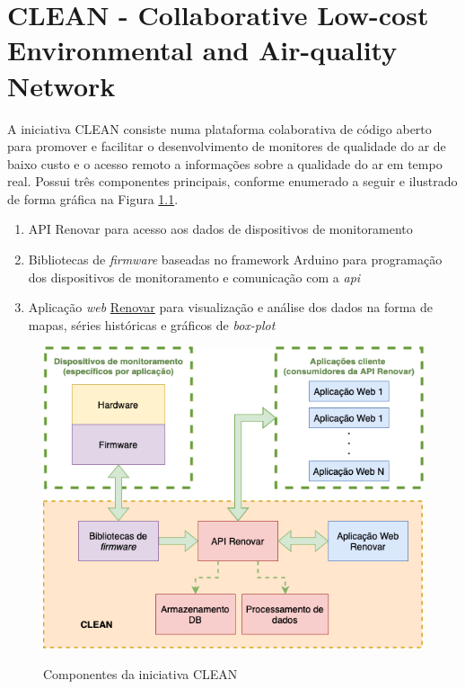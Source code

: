 \chapter{CLEAN - Collaborative Low-cost Environmental and Air-quality Network}\label{cap:clean-initiative}

A iniciativa CLEAN consiste numa plataforma colaborativa de código aberto para promover e facilitar o desenvolvimento de monitores de qualidade do ar de baixo custo e o acesso remoto a informações sobre a qualidade do ar em tempo real. Possui três componentes principais, conforme enumerado a seguir e ilustrado de forma gráfica na Figura \ref{fig:clean-structure}.

\begin{enumerate}
    \item API Renovar para acesso aos dados de dispositivos de monitoramento
    \item Bibliotecas de \textit{firmware} baseadas no framework Arduino para programação dos dispositivos de monitoramento e comunicação com a \textit{api}
    \item Aplicação \textit{web} \href{http://renovar.lcqar.ufsc.br/}{Renovar} para visualização e análise dos dados na forma de mapas, séries históricas e gráficos de \textit{box-plot}
\end{enumerate}

\begin{figure}[h]
    \centering
    \caption{Componentes da iniciativa CLEAN}
    \includegraphics[width=0.80\linewidth]{chapters//2-CLEAN//Figuras/Estrutura CLEAN.png}
    \label{fig:clean-structure}
\end{figure}

